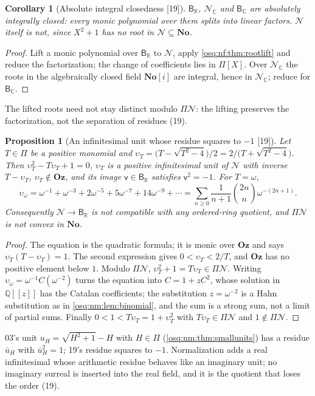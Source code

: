 \documentclass[11pt,letterpaper]{article}
\numberwithin{equation}{section}
\newtheorem{proposition}[proposition]{Proposition}
\newtheorem{corollary}[corollary]{Corollary}
\theoremstyle{definition}
\theoremstyle{remark}
\theoremstyle{plain}
\newcommand{\No}{\mathbf{No}}
\newcommand{\Oz}{\mathbf{Oz}}
\newcommand{\SC}{\No[i]}
\newcommand{\Q}{\mathbb Q}
\newcommand{\R}{\mathbb R}
\newcommand{\C}{\mathbb C}
\newcommand{\NN}{\mathcal N}         %
\newcommand{\src}[1]{\textup{\textsf{[#1]}}}
\begin{document}
\begin{corollary}[Absolute integral closedness \src{19}]\label{osq:nf:cor:aic}
$\mathsf B_\R$, $\NN_\C$ and $\mathsf B_\C$ are absolutely integrally closed: every monic polynomial over them splits into linear factors.
$\NN$ itself is not, since $X^2+1$ has no root in $\NN\subseteq\No$.
\end{corollary}
\begin{proof}
Lift a monic polynomial over $\mathsf B_\R$ to $\NN$, apply \cref{osq:nf:thm:rootlift} and reduce the factorization; the change of coefficients
lies in $\Pi[X]$. Over $\NN_\C$ the roots in the algebraically closed field $\SC$ are integral, hence in $\NN_\C$; reduce for $\mathsf B_\C$.
\end{proof}

The lifted roots need not stay distinct modulo $\Pi\NN$: the lifting preserves the factorization, not the separation of residues (19).

\begin{proposition}[An infinitesimal unit whose residue squares to $-1$ \src{19}]\label{osq:nf:prop:unit}
Let $T\in\Pi$ be a positive monomial and $\upsilon_T=\bigl(T-\sqrt{T^2-4}\bigr)/2=2/\bigl(T+\sqrt{T^2-4}\bigr)$. Then
$\upsilon_T^2-T\upsilon_T+1=0$, $\upsilon_T$ is a positive infinitesimal unit of $\NN$ with inverse $T-\upsilon_T$, $\upsilon_T\notin\Oz$, and its image
$\mathsf v\in\mathsf B_\R$ satisfies $\mathsf v^2=-1$. For $T=\omega$,
\[
 \upsilon_\omega=\omega^{-1}+\omega^{-3}+2\omega^{-5}+5\omega^{-7}+14\omega^{-9}+\cdots=\sum_{n\ge0}\frac1{n+1}\binom{2n}n\omega^{-(2n+1)} .
\]
Consequently $\NN\to\mathsf B_\R$ is not compatible with any ordered-ring quotient, and $\Pi\NN$ is not convex in $\No$.
\end{proposition}
\begin{proof}
The equation is the quadratic formula; it is monic over $\Oz$ and says $\upsilon_T(T-\upsilon_T)=1$. The second expression gives
$0<\upsilon_T<2/T$, and $\Oz$ has no positive element below $1$. Modulo $\Pi\NN$, $\upsilon_T^2+1=T\upsilon_T\in\Pi\NN$. Writing
$\upsilon_\omega=\omega^{-1}C(\omega^{-2})$ turns the equation into $C=1+zC^2$, whose solution in $\Q[[z]]$ has the Catalan coefficients;
the substitution $z=\omega^{-2}$ is a Hahn substitution as in \cref{osq:nm:lem:binomial}, and the sum is a strong sum, not a limit of
partial sums. Finally $0<1<T\upsilon_T=1+\upsilon_T^2$ with $T\upsilon_T\in\Pi\NN$ and $1\notin\Pi\NN$.
\end{proof}

03's unit $u_H=\sqrt{H^2+1}-H$ with $H\in\Pi$ (\cref{osq:nm:thm:smallunits}) has a residue $\bar u_H$ with $\bar u_H^2=1$; 19's residue squares
to $-1$. Normalization adds a real infinitesimal whose arithmetic residue behaves like an imaginary unit; no imaginary surreal is
inserted into the real field, and it is the quotient that loses the order (19).
\end{document}
